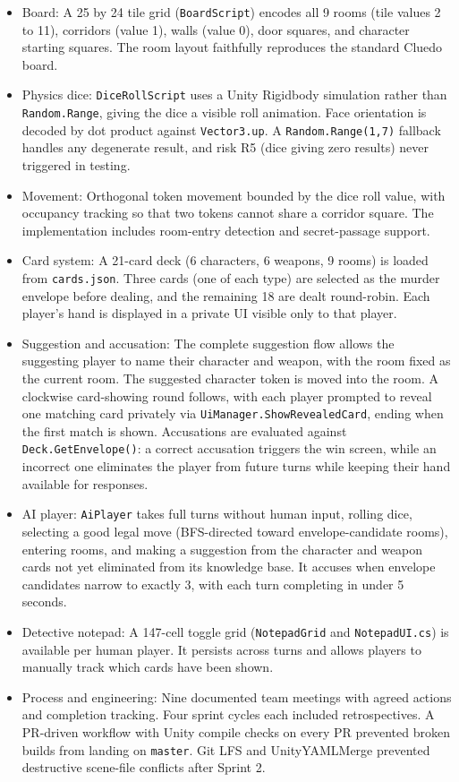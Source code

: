 \begin{itemize}
    \item Board: A 25 by 24 tile grid (\texttt{BoardScript}) encodes all 9 rooms (tile values 2 to 11), corridors (value 1), walls (value 0), door squares, and character starting squares. The room layout faithfully reproduces the standard Cluedo board.
    \item Physics dice: \texttt{DiceRollScript} uses a Unity Rigidbody simulation rather than \texttt{Random.Range}, giving the dice a visible roll animation. Face orientation is decoded by dot product against \texttt{Vector3.up}. A \texttt{Random.Range(1,7)} fallback handles any degenerate result, and risk R5 (dice giving zero results) never triggered in testing.
    \item Movement: Orthogonal token movement bounded by the dice roll value, with occupancy tracking so that two tokens cannot share a corridor square. The implementation includes room-entry detection and secret-passage support.
    \item Card system: A 21-card deck (6 characters, 6 weapons, 9 rooms) is loaded from \texttt{cards.json}. Three cards (one of each type) are selected as the murder envelope before dealing, and the remaining 18 are dealt round-robin. Each player's hand is displayed in a private UI visible only to that player.
    \item Suggestion and accusation: The complete suggestion flow allows the suggesting player to name their character and weapon, with the room fixed as the current room. The suggested character token is moved into the room. A clockwise card-showing round follows, with each player prompted to reveal one matching card privately via \texttt{UiManager.ShowRevealedCard}, ending when the first match is shown. Accusations are evaluated against \texttt{Deck.GetEnvelope()}: a correct accusation triggers the win screen, while an incorrect one eliminates the player from future turns while keeping their hand available for responses.
    \item AI player: \texttt{AiPlayer} takes full turns without human input, rolling dice, selecting a good legal move (BFS-directed toward envelope-candidate rooms), entering rooms, and making a suggestion from the character and weapon cards not yet eliminated from its knowledge base. It accuses when envelope candidates narrow to exactly 3, with each turn completing in under 5 seconds.
    \item Detective notepad: A 147-cell toggle grid (\texttt{NotepadGrid} and \texttt{NotepadUI.cs}) is available per human player. It persists across turns and allows players to manually track which cards have been shown.
    \item Process and engineering: Nine documented team meetings with agreed actions and completion tracking. Four sprint cycles each included retrospectives. A PR-driven workflow with Unity compile checks on every PR prevented broken builds from landing on \texttt{master}. Git LFS and UnityYAMLMerge prevented destructive scene-file conflicts after Sprint 2.
\end{itemize}

